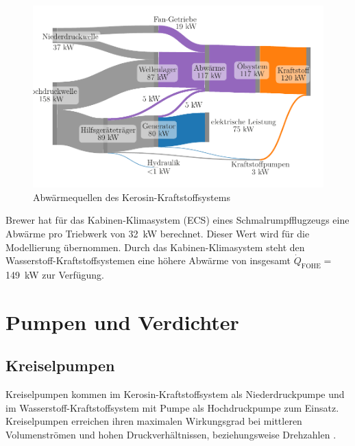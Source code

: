 \begin{figure}[ht]
	\centering
	\includegraphics[width=1\linewidth]{4_Abbildungen/2_Hauptteil/sankey.pdf}
	\caption{Abwärmequellen des Kerosin-Kraftstoffsystems}
	\label{fig:sankey}
\end{figure}
\FloatBarrier 


Brewer \cite{Brewer.1991} hat für das Kabinen-Klimasystem (ECS) eines Schmalrumpfflugzeugs eine Abwärme pro Triebwerk von \SI{32}{\kilo\W} berechnet. Dieser Wert wird für die Modellierung übernommen. Durch das Kabinen-Klimasystem steht den Wasserstoff-Kraftstoffsystemen eine höhere Abwärme von insgesamt $\dot{Q}_{\mathrm{FOHE}}=$ \SI{149}{\kilo\W} zur Verfügung.

\section{Pumpen und Verdichter}

\subsection{Kreiselpumpen}

Kreiselpumpen kommen im Kerosin-Kraftstoffsystem als Niederdruckpumpe und im Wasserstoff-Kraftstoffsystem mit Pumpe als Hochdruckpumpe zum Einsatz. Kreiselpumpen erreichen ihren maximalen Wirkungsgrad bei mittleren Volumenströmen und hohen Druckverhältnissen, beziehungsweise Drehzahlen \cite{Gulich.2013}. %


